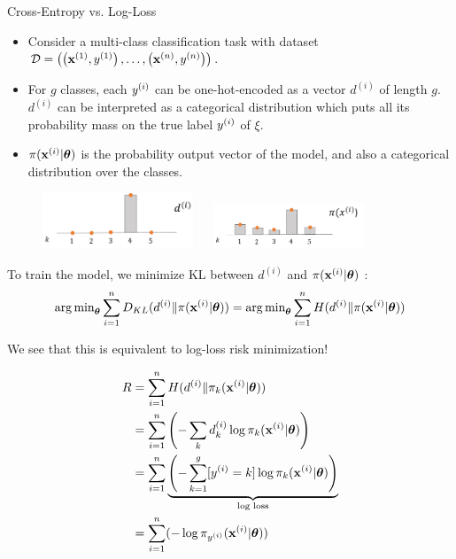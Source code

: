 \documentclass[11pt,compress,t,notes=noshow, xcolor=table]{beamer}
\begin{document}
\begin{vbframe}{Cross-Entropy vs. Log-Loss}

  \begin{itemize}
    \item Consider a multi-class classification task with dataset $\mathcal{D} = \left( \left(\mathbf{x}^{(1)}, y^{(1)}\right), \ldots, \left(\mathbf{x}^{(n)}, y^{(n)}\right)\right)$.
    \item For $g$ classes, each $y^{(i)}$ can be one-hot-encoded as a vector $d^{(i)}$ of length $g$. $d^{(i)}$ can be interpreted as a categorical distribution which puts all its probability mass on the true label $y^{(i)}$ of $\xi$.
    \item $\pi(\mathbf{x}^{(i)}|\bm{\theta})$ is the probability output vector of the model, and also a categorical distribution over the classes.

  \end{itemize}
\lz
\begin{figure}
\includegraphics[width=0.4\textwidth]{figure_man/multinoulli.png}
~~
\includegraphics[width=0.4\textwidth]{figure_man/multiclass-predictive.png}
\end{figure}
    \framebreak

    
To train the model, we minimize KL between $d^{(i)}$ and $\pi(\mathbf{x}^{(i)}|\bm{\theta})$ :
$$ \operatorname{arg\,min}_{\bm{\theta}} \sum_{i=1}^n D_{KL} (d^{(i)} \| \pi(\mathbf{x}^{(i)}|\bm{\theta})) = \operatorname{arg\,min}_{\bm{\theta}} \sum_{i=1}^n  H(d^{(i)} \| \pi(\mathbf{x}^{(i)}|\bm{\theta})) $$
  
We see that this is equivalent to log-loss risk minimization!
  \begin{footnotesize}
    \begin{equation*}
      \begin{split}
               R &= \sum\limits_{i=1}^n  H(d^{(i)} \| \pi_k(\mathbf{x}^{(i)}|\bm{\theta})) \\
                 &= \sum\limits_{i=1}^n \left( - \sum_k d^{(i)}_k \log\pi_k(\mathbf{x}^{(i)}|\bm{\theta}) \right) \\
                 & = \sum\limits_{i=1}^n \underbrace{ \left( -\sum_{k = 1}^g [y^{(i)} = k]\log \pi_{k}(\mathbf{x}^{(i)}|\bm{\theta}) \right) }_{\text{log loss}} \\
                 & = \sum\limits_{i=1}^n (-\log\pi_{y^{(i)}}(\mathbf{x}^{(i)}|\bm{\theta})) 
      \end{split}
    \end{equation*}
  \end{footnotesize}
\end{vbframe}
\end{document}
